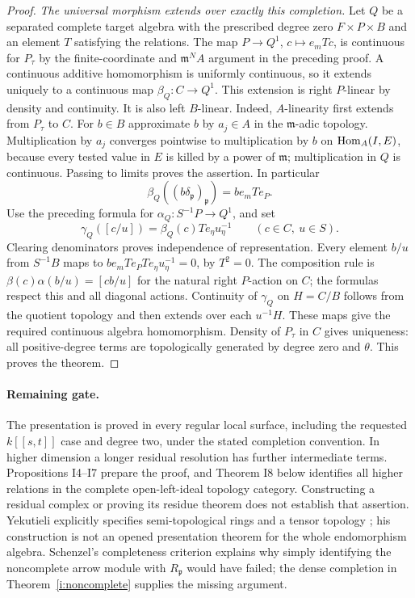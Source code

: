 \begin{proof}
\emph{The universal morphism extends over exactly this completion.}
Let $Q$ be a separated complete target algebra with the prescribed
degree zero $F\times P\times B$ and an element $T$ satisfying the
relations. The map $P\to Q^1$, $c\mapsto e_mTc$, is continuous
for $P_\tau$ by the finite-coordinate and $\mathfrak m^NA$ argument
in the preceding proof. A continuous additive homomorphism is
uniformly continuous, so it extends uniquely to a continuous map
$\beta_Q:C\to Q^1$. This extension is right $P$-linear by
density and continuity. It is also left $B$-linear. Indeed,
$A$-linearity first extends from $P_\tau$ to $C$. For $b\in B$
approximate $b$ by $a_j\in A$ in the $\mathfrak m$-adic topology.
Multiplication by $a_j$ converges pointwise to multiplication by $b$
on $\operatorname{Hom}_A(I,E)$, because every tested value in $E$ is killed
by a power of $\mathfrak m$; multiplication in $Q$ is continuous.
Passing to limits proves the assertion. In particular
\[
 \beta_Q((b\delta_{\mathfrak p})_{\mathfrak p})=b e_mTe_P.
\]
Use the preceding formula for $\alpha_Q:S^{-1}P\to Q^1$, and set
\[
 \gamma_Q([c/u])=\beta_Q(c)Te_\eta u_\eta^{-1}
 \qquad(c\in C,\ u\in S).
\]
Clearing denominators proves independence of representation.
Every element $b/u$ from $S^{-1}B$ maps to
$b e_mTe_PTe_\eta u_\eta^{-1}=0$, by $T^2=0$.
The composition rule is
$\beta(c)\alpha(b/u)=[cb/u]$ for the natural right $P$-action
on $C$; the formulas respect this and all diagonal actions.
Continuity of $\gamma_Q$ on $H=C/B$ follows from the quotient
topology and then extends over each $u^{-1}H$. These maps give the
required continuous algebra homomorphism. Density of $P_\tau$ in
$C$ gives uniqueness: all positive-degree terms are topologically
generated by degree zero and $\theta$. This proves the theorem.
\end{proof}

\paragraph{Remaining gate.}
The presentation is proved in every regular local surface, including
the requested $k[[s,t]]$ case and degree two, under the stated
completion convention. In higher dimension a longer residual
resolution has further intermediate terms. Propositions I4--I7
prepare the proof, and Theorem I8 below identifies all higher relations
in the complete open-left-ideal topology category.
Constructing a residual complex or proving its residue theorem does
not establish that assertion. Yekutieli explicitly specifies
semi-topological rings and a tensor topology
\cite[Definitions 1.2.1 and 1.2.11, pp.~15 and 18]{Yekutieli1992};
his construction is not an opened presentation theorem for the whole
endomorphism algebra. Schenzel's completeness criterion explains why
simply identifying the noncomplete arrow module with
$R_{\mathfrak p}$ would have failed; the dense completion in
Theorem~\ref{i:noncomplete} supplies the missing argument.

